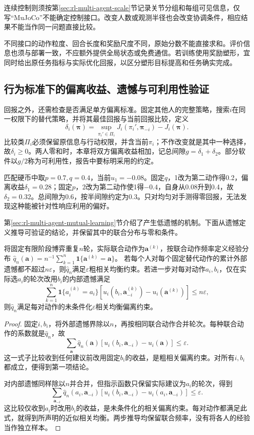 连续控制则须按第\ref{sec:rl-multi-agent-scale}节记录关节分组和每组可见信息，仅写“MuJoCo”不能确定控制接口。改变人数或观测半径也会改变协调条件，相应结果不能当作同一问题直接比较。

不同接口的动作粒度、回合长度和奖励尺度不同，原始分数不能直接求和。评价信息也须与部署一致，不应额外提供全局状态或免费通信。若训练使用奖励塑形，宜同时给出原任务指标与实际优化回报，以区分塑形目标提高和任务确实完成。

\subsection{行为标准下的偏离收益、遗憾与可利用性验证}
\label{sec:rl-multi-agent-deviations}

回报之外，还需检查是否满足单方偏离标准。固定其他人的完整策略，搜索$i$在同一权限下的替代策略，并将其最佳回报与当前回报比较，定义
\[
 \delta_i(\bm\pi)=
 \sup_{\pi_i'\in\Pi_i}J_i(\pi_i',\bm\pi_{-i})-J_i(\bm\pi).
\]
比较类$\Pi_i$必须保留原信息与行动权限，并含当前$\pi_i$；不作改变就是其中一种选择，故$\delta_i\geq0$。两人零和时，本章将双方偏离收益相加，记总间隙$g=\delta_1+\delta_2$。部分软件以$g/2$称为可利用性，报告中要标明采用的约定。

匹配硬币中取$p=0.7,q=0.4$，当前$u_1=-0.08$。固定$q$，1改为第二动作得0.2，偏离收益$\delta_1=0.28$；固定$p$，2改为第二动作使1得$-0.4$，自身从0.08升到0.4，故$\delta_2=0.32$。总间隙为0.6，按半间隙约定为0.3。只对均匀对手测得零回报，无法发现这种能被针对性响应利用的偏好。

第\ref{sec:rl-multi-agent-mutual-learning}节介绍了产生低遗憾的机制。下面从遗憾定义推导可验证的结论，并保留其中的联合分布与零和条件。

\begin{theorem}[阶段遗憾与联合经验分布]
\label{thm:rl-multi-agent-regret-ce}
将固定有限阶段博弈重复$n$轮，实际联合动作为$\bm a^{(k)}$，按联合动作频率定义经验分布
$\hat q_n(\bm a)=n^{-1}\sum_{k=1}^n\mathbf1\{\bm a^{(k)}=\bm a\}$。
若每个人对每个固定替代动作的累计外部遗憾都不超过$n\varepsilon$，则$\hat q_n$满足$\varepsilon$粗相关均衡约束。若进一步对每对动作$a_i,b_i$，仅在实际选$a_i$的轮次改用$b_i$的内部遗憾满足
\[
 \sum_{k=1}^n\mathbf1\{a_i^{(k)}=a_i\}
 [u_i(b_i,\bm a_{-i}^{(k)})-u_i(\bm a^{(k)})]
 \leq n\varepsilon,
\]
则$\hat q_n$满足每对动作的未条件化$\varepsilon$相关均衡偏离约束。
\end{theorem}
\begin{proof}
固定$i,b_i$，将外部遗憾界除以$n$，再按相同联合动作合并轮次。每种联合动作的系数就是$\hat q_n$，故
\[
 \sum_{\bm a}\hat q_n(\bm a)
 [u_i(b_i,\bm a_{-i})-u_i(\bm a)]\leq\varepsilon.
\]
这一式子比较收到任何建议前改用固定$b_i$的收益，是粗相关偏离约束。对所有$i,b_i$都成立，便得到第一项结论。

对内部遗憾同样除以$n$并合并，但指示函数只保留实际建议为$a_i$的轮次，得到
\[
 \sum_{\bm a_{-i}}\hat q_n(a_i,\bm a_{-i})
 [u_i(b_i,\bm a_{-i})-u_i(a_i,\bm a_{-i})]\leq\varepsilon.
\]
这比较仅收到$a_i$时改用$b_i$的收益，是未条件化的相关偏离约束。每对动作都满足此式，就得到所声明的近似相关均衡。两步推导均保留联合频率，没有将各人的经验当作独立样本。
\end{proof}

